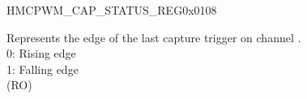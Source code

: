 \begin{register}{H}{MCPWM\_CAP\_STATUS\_REG}{0x0108}\label{regdesc:MCPWMCAPSTATUSREG}
%
%
%
%
\regnewline%
\begin{regdesc}\begin{reglist}
\label{fielddesc:MCPWMCAPNEDGE}\item [MCPWM\_CAP\regindex{n}\_EDGE] Represents the edge of the last capture trigger on channel . 
\\0: Rising edge
\\1: Falling edge
\\(RO)
\end{reglist}\end{regdesc}
\end{register}



